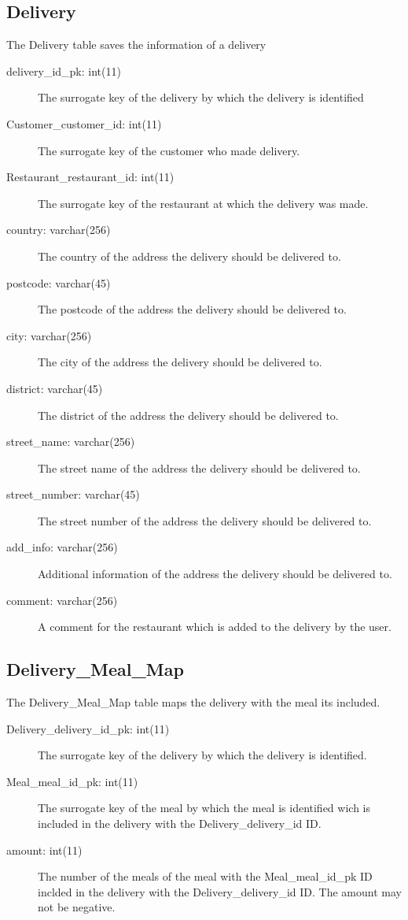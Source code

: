     \subsection{Delivery}
    The Delivery table saves the information of a delivery
    \begin{description}
        \item[delivery\_id\_pk: int(11)] The surrogate key of the delivery by which the delivery is identified
        \item[Customer\_customer\_id: int(11)] The surrogate key of the customer who made delivery.
        \item[Restaurant\_restaurant\_id: int(11)] The surrogate key of the restaurant at which the delivery was made. 
        \item[country: varchar(256)] The country of the address the delivery should be delivered to.
        \item[postcode: varchar(45)] The postcode of the address the delivery should be delivered to.
        \item[city: varchar(256)] The city of the address the delivery should be delivered to.
        \item[district: varchar(45)] The district of the address the delivery should be delivered to.
        \item[street\_name: varchar(256)] The street name of the address the delivery should be delivered to.
        \item[street\_number: varchar(45)] The street number of the address the delivery should be delivered to.
        \item[add\_info: varchar(256)] Additional information of the address the delivery should be delivered to.
        \item[comment: varchar(256)] A comment for the restaurant which is added to the delivery by the user.
    \end{description}

    \subsection{Delivery\_Meal\_Map}
    The Delivery\_Meal\_Map table maps the delivery with the meal its included.
    \begin{description}
        \item[Delivery\_delivery\_id\_pk: int(11)] The surrogate key of the delivery by which the delivery is identified.
        \item[Meal\_meal\_id\_pk: int(11)] The surrogate key of the meal by which the meal is identified wich is included in the delivery with the Delivery\_delivery\_id ID.
        \item[amount: int(11)] The number of the meals of the meal with the Meal\_meal\_id\_pk ID inclded in the delivery with the Delivery\_delivery\_id ID. The amount may not be negative.
    \end{description}

